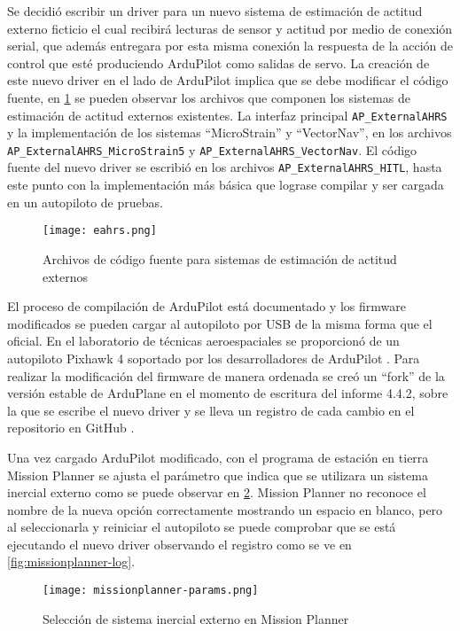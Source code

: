Se decidió escribir un driver para un nuevo sistema de estimación de actitud externo ficticio el cual recibirá lecturas de sensor y actitud por medio de conexión serial, que además entregara por esta misma conexión la respuesta de la acción de control que esté produciendo ArduPilot como salidas de servo. La creación de este nuevo driver en el lado de ArduPilot implica que se debe modificar el código fuente, en \cref{fig:eahrs} se pueden observar los archivos que componen los sistemas de estimación de actitud externos existentes. La interfaz principal \texttt{AP\_ExternalAHRS} y la implementación de los sistemas ``MicroStrain'' y ``VectorNav'', en los archivos \texttt{AP\_ExternalAHRS\_MicroStrain5} y \texttt{AP\_ExternalAHRS\_VectorNav}. El código fuente del nuevo driver se escribió en los archivos \texttt{AP\_ExternalAHRS\_HITL}, hasta este punto con la implementación más básica que lograse compilar y ser cargada en un autopiloto de pruebas.

\begin{figure}[h]
    \centering
    \texttt{[image: eahrs.png]}
    \caption{Archivos de código fuente para sistemas de estimación de actitud externos}
    \label{fig:eahrs}
\end{figure}

El proceso de compilación de ArduPilot está documentado \cite{ap-build} y los firmware modificados se pueden cargar al autopiloto por USB de la misma forma que el oficial. En el laboratorio de técnicas aeroespaciales se proporcionó de un autopiloto Pixhawk 4 soportado por los desarrolladores de ArduPilot \cite{pixhawk4}. Para realizar la modificación del firmware de manera ordenada se creó un ``fork'' de la versión estable de ArduPlane en el momento de escritura del informe 4.4.2, sobre la que se escribe el nuevo driver y se lleva un registro de cada cambio en el repositorio en GitHub \cite{ap-hitl-fork}.

Una vez cargado ArduPilot modificado, con el programa de estación en tierra Mission Planner se ajusta el parámetro que indica que se utilizara un sistema inercial externo como se puede observar en \cref{fig:missionplanner-params}. Mission Planner no reconoce el nombre de la nueva opción correctamente mostrando un espacio en blanco, pero al seleccionarla y reiniciar el autopiloto se puede comprobar que se está ejecutando el nuevo driver observando el registro como se ve en \cref{fig:missionplanner-log}.

\begin{figure}[h]
    \centering
    \texttt{[image: missionplanner-params.png]}
    \caption{Selección de sistema inercial externo en Mission Planner}
    \label{fig:missionplanner-params}
\end{figure}

